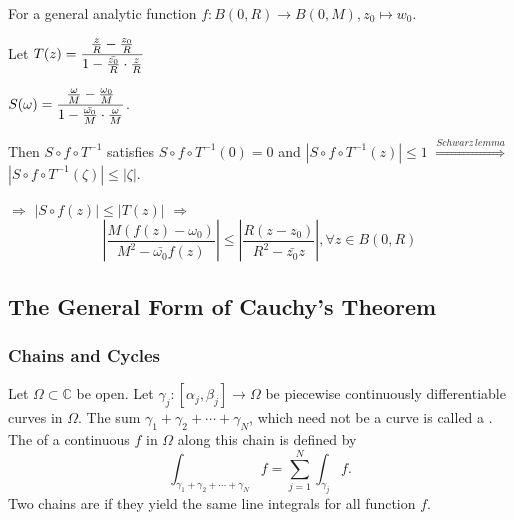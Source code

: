\begin{remark}
    For a general analytic function $ f:B(0,R)\rightarrow B(0,M),z_0\mapsto w_0 $.

    Let  $ T(z)=\displaystyle\frac{\frac{z}{R}-\frac{z_0}{R}}{1-\frac{\bar{z_0}}{R}\cdot \frac{z}{R}} $
    
     $ S(\omega)=\displaystyle\frac{\frac{\omega}{M}-\frac{\omega_0}{M}}{1-\frac{\bar{\omega_0}}{M}\cdot \frac{\omega}{M}} $.
     
     Then  $ S\circ f\circ T^{-1} $ satisfies  $ S\circ f\circ T^{-1}(0)=0 $ and  $ |S\circ f\circ T^{-1}(z)| \leq 1 $ $ \overset{Schwarz\,lemma}{\Longrightarrow} $  $ |S\circ f\circ T^{-1}(\zeta)| \leq |\zeta| $.
     
      $ \Rightarrow  $ $ |S\circ f(z)| \leq |T(z)| $  $ \Rightarrow  $
      \[\left|\frac{M(f(z)-\omega_0)}{M^2-\bar{\omega_0}f(z)}\right| \leq \left|\frac{R(z-z_0)}{R^2-\bar{z_0}z}\right|,\forall z\in B(0,R)\]  
\end{remark}
\subsection{The General Form of Cauchy's Theorem}
\subsubsection{Chains and Cycles}
Let  $ \Omega\subset \mathbb{C} $ be open. Let  $ \gamma_j:[\alpha_j,\beta_j]\rightarrow \Omega $ be piecewise continuously differentiable curves in  $ \Omega $. The sum  $ \gamma_1+\gamma_2+\cdots+\gamma_N $, which need not be a curve is called a . The  of a continuous  $ f $ in  $ \Omega $ along this chain is defined by 
\begin{equation}
    \int_{\gamma_1+\gamma_2+\cdots+\gamma_N}f=\sum_{j=1}^N\int_{\gamma_j}f.
\end{equation}   
Two chains are  if they yield the same line integrals for all function $ f $. 
